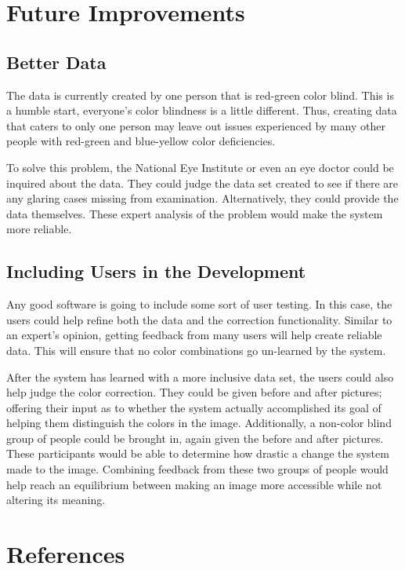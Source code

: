 \documentclass[12pt]{article}
\begin{document}
\section{Future Improvements}
\subsection{Better Data}
The data is currently created by one person that is red-green color blind. This is a humble start, everyone's color blindness is a little different. Thus, creating data that caters to only one person may leave out issues experienced by many other people with red-green and blue-yellow color deficiencies.

To solve this problem, the National Eye Institute or even an eye doctor could be inquired about the data. They could judge the data set created to see if there are any glaring cases missing from examination. Alternatively, they could provide the data themselves. These expert analysis of the problem would make the system more reliable.

\subsection{Including Users in the Development}
Any good software is going to include some sort of user testing. In this case, the users could help refine both the data and the correction functionality. Similar to an expert's opinion, getting feedback from many users will help create reliable data. This will ensure that no color combinations go un-learned by the system. 

After the system has learned with a more inclusive data set, the users could also help judge the color correction. They could be given before and after pictures; offering their input as to whether the system actually accomplished its goal of helping them distinguish the colors in the image. Additionally, a non-color blind group of people could be brought in, again given the before and after pictures. These participants would be able to determine how drastic a change the system made to the image. Combining feedback from these two groups of people would help reach an equilibrium between making an image more accessible while not altering its meaning.


\pagebreak
\section{References}
{}

\end{document}
